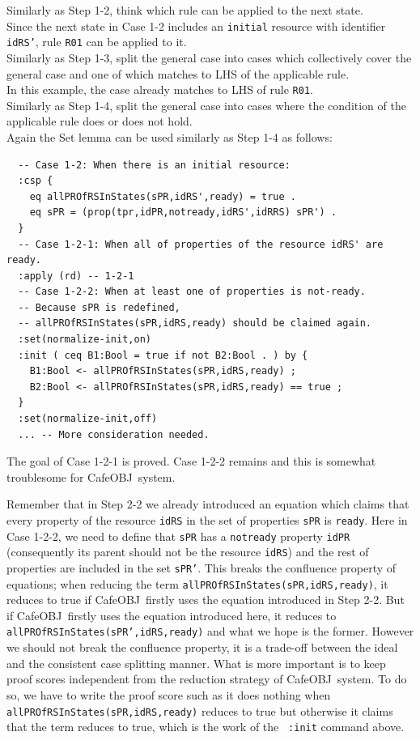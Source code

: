 \documentclass[12pt]{report}
\newcommand{\stt}[1]{{\small{\tt {#1}}}}
\newcommand{\cafeobj}{{\sf CafeOBJ}~}
\begin{document}
 Similarly as Step 1-2, think which rule can
be applied to the next state. \\ Since the next state in Case 1-2
includes an {\tt initial} resource with identifier {\tt idRS'}, rule
{\tt R01} can be applied to it.\\

 Similarly as Step 1-3, split the general case
into cases which collectively cover the general case and one of which
matches to LHS of the applicable rule. \\ In this example, the case
already matches to LHS of rule {\tt R01}.\\

 Similarly as Step 1-4, split the general case
into cases where the condition of the applicable rule does or does not
hold. \\ Again the Set lemma can be used similarly as Step 1-4 as
follows:
\small
\begin{verbatim}
  -- Case 1-2: When there is an initial resource:
  :csp {
    eq allPROfRSInStates(sPR,idRS',ready) = true .
    eq sPR = (prop(tpr,idPR,notready,idRS',idRRS) sPR') .
  }
  -- Case 1-2-1: When all of properties of the resource idRS' are ready.
  :apply (rd) -- 1-2-1
  -- Case 1-2-2: When at least one of properties is not-ready.
  -- Because sPR is redefined, 
  -- allPROfRSInStates(sPR,idRS,ready) should be claimed again.
  :set(normalize-init,on)
  :init ( ceq B1:Bool = true if not B2:Bool . ) by {
    B1:Bool <- allPROfRSInStates(sPR,idRS,ready) ;
    B2:Bool <- allPROfRSInStates(sPR,idRS,ready) == true ;
  }
  :set(normalize-init,off)
  ... -- More consideration needed.
\end{verbatim}
\normalsize
The goal of Case 1-2-1 is proved. Case 1-2-2 remains and this is somewhat
troublesome for \cafeobj system.

Remember that in Step 2-2 we already introduced an equation which
claims that every property of the resource {\tt idRS} in the set of
properties {\tt sPR} is {\tt ready}. Here in Case 1-2-2, we need to
define that {\tt sPR} has a {\tt notready} property {\tt idPR}
(consequently its parent should not be the resource {\tt idRS}) and
the rest of properties are included in the set {\tt sPR'}. This breaks
the confluence property of equations; when reducing the term
\stt{allPROfRSInStates(sPR,idRS,ready)}, it reduces to true if
\cafeobj firstly uses the equation introduced in Step 2-2. But if
\cafeobj firstly uses the equation introduced here, it reduces to
\stt{allPROfRSInStates(sPR',idRS,ready)} and what we hope is the
former. However we should not break the confluence property, it is a
trade-off between the ideal and the consistent case splitting manner.
What is more important is to keep proof scores independent from the
reduction strategy of \cafeobj system. To do so, we have to write the
proof score such as it does nothing when
\stt{allPROfRSInStates(sPR,idRS,ready)} reduces to true but otherwise
it claims that the term reduces to true, which is the work of the {\tt
  :init} command above.
\end{document}
